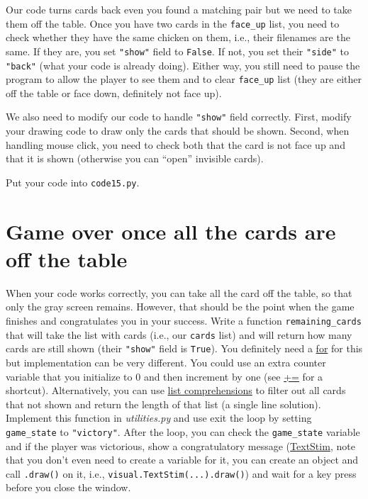 \documentclass[
]{book}
\begin{document}
Our code turns cards back even you found a matching pair but we need to take them off the table. Once you have two cards in the \texttt{face\_up} list, you need to check whether they have the same chicken on them, i.e., their filenames are the same. If they are, you set \texttt{"show"} field to \texttt{False}. If not, you set their \texttt{"side"} to \texttt{"back"} (what your code is already doing). Either way, you still need to pause the program to allow the player to see them and to clear \texttt{face\_up} list (they are either off the table or face down, definitely not face up).

We also need to modify our code to handle \texttt{"show"} field correctly. First, modify your drawing code to draw only the cards that should be shown. Second, when handling mouse click, you need to check both that the card is not face up and that it is shown (otherwise you can ``open'' invisible cards).

Put your code into \texttt{code15.py}.

\hypertarget{game-over-once-all-the-cards-are-off-the-table}{%
\section{Game over once all the cards are off the table}\label{game-over-once-all-the-cards-are-off-the-table}}

When your code works correctly, you can take all the card off the table, so that only the gray screen remains. However, that should be the point when the game finishes and congratulates you in your success. Write a function \texttt{remaining\_cards} that will take the list with cards (i.e., our \texttt{cards} list) and will return how many cards are still shown (their \texttt{"show"} field is \texttt{True}). You definitely need a \protect\hyperlink{for-loop}{for} for this but implementation can be very different. You could use an extra counter variable that you initialize to 0 and then increment by one (see \href{https://docs.python.org/3/reference/simple_stmts.html\#augmented-assignment-statements}{+=} for a shortcut). Alternatively, you can use \href{l\#list-comprehension}{list comprehensions} to filter out all cards that not shown and return the length of that list (a single line solution). Implement this function in \emph{utilities.py} and use exit the loop by setting \texttt{game\_state} to \texttt{"victory"}. After the loop, you can check the \texttt{game\_state} variable and if the player was victorious, show a congratulatory message (\href{https://psychopy.org/api/visual/textstim.html\#psychopy.visual.TextStim}{TextStim}, note that you don't even need to create a variable for it, you can create an object and call \texttt{.draw()} on it, i.e., \texttt{visual.TextStim(...).draw()}) and wait for a key press before you close the window.
\end{document}
